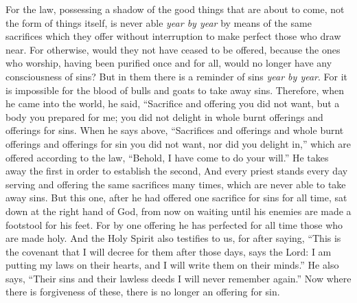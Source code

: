 \begin{biblechapter} %
 For the law, possessing a shadow of the good things that are about to come, not the form of things itself, is never able \textit{year by year} by means of the same sacrifices which they offer without interruption to make perfect those who draw near.
\verse For otherwise, would they not have ceased to be offered, because the ones who worship, having been purified once and for all, would no longer have any consciousness of sins?
\verse But in them there is a reminder of sins \textit{year by year}.
\verse For it is impossible for the blood of bulls and goats to take away sins.
\verse Therefore, when he came into the world, he said,
\verse “Sacrifice and offering you did not want, 
but a body you prepared for me;
\verse you did not delight in whole burnt offerings and offerings for sins.
\verse When he says above, “Sacrifices and offerings and whole burnt offerings and offerings for sin 
you did not want, nor did you delight in,”
\verse which are offered according to the law, “Behold, I have come to do your will.”
\verse He takes away the first in order to establish the second,
\verse And every priest stands every day serving and offering the same sacrifices many times, which are never able to take away sins.
\verse But this one, after he had offered one sacrifice for sins for all time, sat down at the right hand of God,
\verse from now on waiting until his enemies are made a footstool for his feet.
\verse For by one offering he has perfected for all time those who are made holy.
\verse And the Holy Spirit also testifies to us, for after saying,
\verse “This is the covenant that I will decree for them 
after those days, says the Lord: 
I am putting my laws on their hearts, 
and I will write them on their minds.”
\verse He also says, “Their sins and their lawless deeds I will never remember again.”
\verse Now where there is forgiveness of these, there is no longer an offering for sin.

\end{biblechapter}
